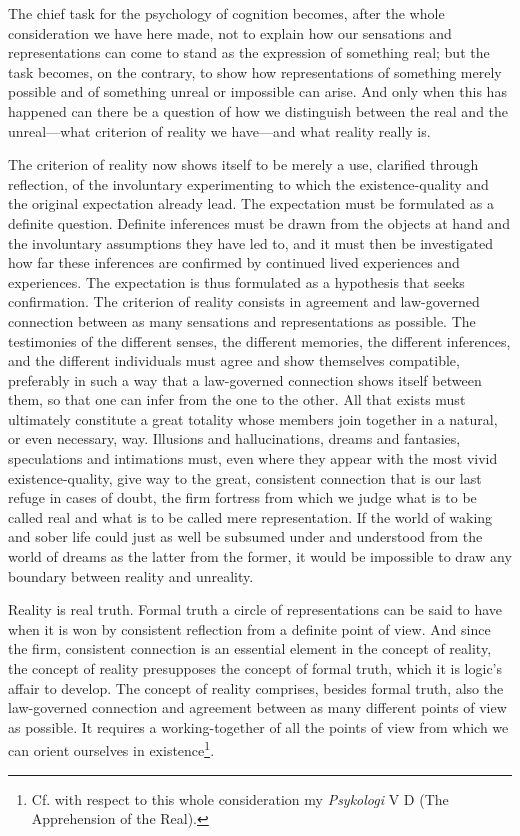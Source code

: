 \documentclass[12pt,a4paper]{book}
\newcommand{\opage}[1]{\marginnote{\footnotesize\textit{[#1]}}}
\begin{document}
The chief task for the psychology of cognition becomes, after the whole
consideration we have here made, not to explain how our sensations and
representations can come to stand as the expression of something real; but
the task becomes, on the contrary, to show how representations of something
merely possible and of something unreal or impossible can arise. And only
when this has happened can there be a question of how we distinguish
between the real and the unreal---what criterion of reality we have---and
what reality really is.

The criterion of reality now shows itself to be merely a use, clarified
through reflection, of the involuntary experimenting to which the
existence-quality and the original expectation already lead. The
expectation must be formulated as a definite question. Definite inferences
must be drawn from the objects at hand and the involuntary assumptions they
have led to, and it must then be investigated how far these inferences are
confirmed by continued lived experiences and experiences. The expectation
is thus formulated as a hypothesis that seeks confirmation. The criterion
of reality consists in agreement and law-governed connection between as
many sensations and representations as possible. The testimonies of the
different senses, the different memories, the different inferences, and the
different individuals must agree and show themselves compatible, preferably
in such a way that a law-governed connection shows itself between them, so
that one can infer from the one to the other. All that exists must
ultimately constitute \opage{104}a great totality whose members join together in a
natural, or even necessary, way. Illusions and hallucinations, dreams and
fantasies, speculations and intimations must, even where they appear with
the most vivid existence-quality, give way to the great, consistent
connection that is our last refuge in cases of doubt, the firm fortress
from which we judge what is to be called real and what is to be called mere
representation. If the world of waking and sober life could just as well be
subsumed under and understood from the world of dreams as the latter from
the former, it would be impossible to draw any boundary between reality and
unreality.

Reality is real truth. Formal truth a circle of representations can be said
to have when it is won by consistent reflection from a definite point of
view. And since the firm, consistent connection is an essential element in
the concept of reality, the concept of reality presupposes the concept of
formal truth, which it is logic's affair to develop. The concept of
reality comprises, besides formal truth, also the law-governed connection
and agreement between as many different points of view as possible. It
requires a working-together of all the points of view from which we can
orient ourselves in existence\footnote{Cf. with respect to this whole
consideration my \emph{Psykologi} V D (The Apprehension of the Real).}.
\end{document}
